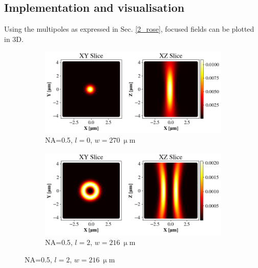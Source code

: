 \subsection{Implementation and visualisation}
Using the multipoles as expressed in Sec. \ref{2_rose}, focused fields can be plotted in 3D.

\begin{figure}
    \begin{subfigure}[b]{0.49\textwidth}
        \centering
        \includegraphics[width=\textwidth]{Figures/Efoc_NA5_l0.png}
        \caption{NA=0.5, \( l=0 \), \( w=270\ \mathrm{\upmu m} \)}
        \label{fig:a}
    \end{subfigure}
    \begin{subfigure}[b]{0.49\textwidth}
        \includegraphics[width=\textwidth]{Figures/Efoc_NA5_l2.png}
        \caption{NA=0.5, \( l=2 \), \( w=216\ \mathrm{\upmu m} \)}
        \label{fig:b}
    \end{subfigure}

    \par


\end{figure}
